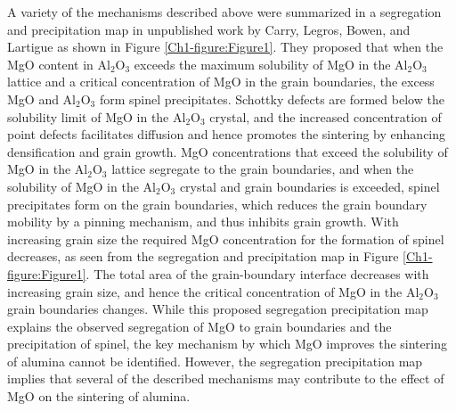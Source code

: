 A variety of the mechanisms described above were summarized in a segregation and precipitation map in unpublished work by Carry, Legros, Bowen, and Lartigue \cite{Zuo2013} as shown in Figure \ref{Ch1-figure:Figure1}. They proposed that when the MgO content in Al$_{2}$O$_{3}$ exceeds the maximum solubility of MgO in the Al$_{2}$O$_{3}$ lattice and a critical concentration of MgO in the grain boundaries, the excess MgO and Al$_{2}$O$_{3}$ form spinel precipitates. Schottky defects are formed below the solubility limit of MgO in the Al$_{2}$O$_{3}$ crystal, and the increased concentration of point defects facilitates diffusion and hence promotes the sintering by enhancing densification and grain growth. MgO concentrations that exceed the solubility of MgO in the Al$_{2}$O$_{3}$ lattice segregate to the grain boundaries, and when the solubility of MgO in the Al$_{2}$O$_{3}$ crystal and grain boundaries is exceeded, spinel precipitates form on the grain boundaries, which reduces the grain boundary mobility by a pinning mechanism, and thus inhibits grain growth. With increasing grain size the required MgO concentration for the formation of spinel decreases, as seen from the segregation and precipitation map in Figure \ref{Ch1-figure:Figure1}. The total area of the grain-boundary interface decreases with increasing grain size, and hence the critical concentration of MgO in the Al$_{2}$O$_{3}$ grain boundaries changes. While this proposed segregation precipitation map explains the observed segregation of MgO to grain boundaries and the precipitation of spinel, the key mechanism by which MgO improves the sintering of alumina cannot be identified. However, the segregation precipitation map implies that several of the described mechanisms may contribute to the effect of MgO on the sintering of alumina.


